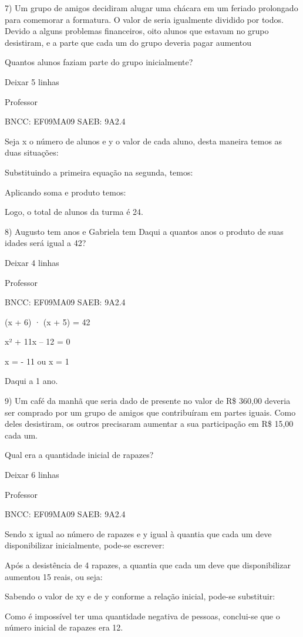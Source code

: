 \begin{escolha}
{{{\begin{escolha}
{7) Um grupo de amigos decidiram alugar uma chácara em um feriado
prolongado para comemorar a formatura. O valor de seria igualmente
dividido por todos. Devido a alguns problemas financeiros, oito alunos
que estavam no grupo desistiram, e a parte que cada um do grupo deveria
pagar aumentou

Quantos alunos faziam parte do grupo inicialmente?

Deixar 5 linhas

Professor

BNCC: EF09MA09 SAEB: 9A2.4

Seja x o número de alunos e y o valor de cada aluno, desta maneira temos
as duas situações:

Substituindo a primeira equação na segunda, temos:

Aplicando soma e produto temos:

Logo, o total de alunos da turma é 24.

8) Augusto tem anos e Gabriela tem Daqui a quantos anos o produto de
suas idades será igual a 42?

Deixar 4 linhas

Professor

BNCC: EF09MA09 SAEB: 9A2.4

(x + 6) · (x + 5) = 42

x² + 11x -- 12 = 0

x = - 11 ou x = 1

Daqui a 1 ano.

9) Um café da manhã que seria dado de presente no valor de R\$ 360,00
deveria ser comprado por um grupo de amigos que contribuíram em partes
iguais. Como deles desistiram, os outros precisaram aumentar a sua
participação em R\$ 15,00 cada um.

Qual era a quantidade inicial de rapazes?

Deixar 6 linhas

Professor

BNCC: EF09MA09 SAEB: 9A2.4

Sendo x igual ao número de rapazes e y igual à quantia que cada um deve
disponibilizar inicialmente, pode-se escrever:

Após a desistência de 4 rapazes, a quantia que cada um deve que
disponibilizar aumentou 15 reais, ou seja:

Sabendo o valor de xy e de y conforme a relação inicial, pode-se
substituir:

Como é impossível ter uma quantidade negativa de pessoas, conclui-se que
o número inicial de rapazes era 12.

}
\end{escolha}}}}
\end{escolha}
